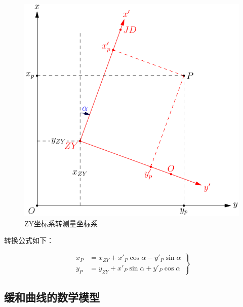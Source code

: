 \begin{figure}[htbp]
    \centering
    \includegraphics[scale=0.8]{route/xytoxyroute.pdf}
    \caption{ZY坐标系转测量坐标系}
    \label{fig:xytoxyroute}
\end{figure}

转换公式如下：

\begin{equation}
\left . \begin{aligned}
x_{P} &= x_{ZY} + x'_P \cos \alpha - y'_P \sin \alpha  \\
y_{P} &= y_{ZY} + x'_P \sin \alpha + y'_P \cos \alpha 
\end{aligned} \right \}
\label{eq:routexytoxy}
\end{equation}

 \subsection{缓和曲线的数学模型}

